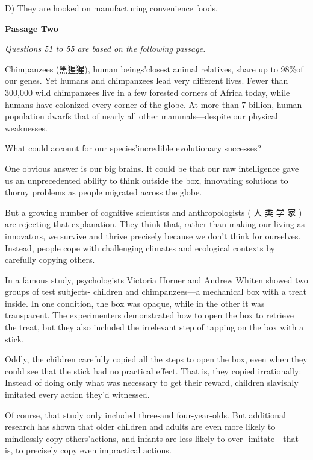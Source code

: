 \noindent\hspace{1.6em}D) They are hooked on manufacturing convenience foods.\par
\smallskip
\noindent\textbf{Passage Two}\par
\smallskip
\noindent\textit{Questions 51 to 55 are based on the following passage.}\par
\smallskip
\noindent Chimpanzees (黑猩猩), human beings'closest animal relatives, share up to 98\%of our genes. Yet humans and chimpanzees lead very different lives. Fewer than 300,000 wild chimpanzees live in a few forested corners of Africa today, while humans have colonized every corner of the globe. At more than 7 billion, human population dwarfs that of nearly all other mammals---despite our physical weaknesses.\par
\smallskip
\noindent What could account for our species'incredible evolutionary successes?\par
\smallskip
\noindent One obvious answer is our big brains. It could be that our raw intelligence gave us an unprecedented ability to think outside the box, innovating solutions to thorny problems as people migrated across the globe.\par
\smallskip
\noindent But a growing number of cognitive scientists and anthropologists ( 人 类 学 家 ) are rejecting that explanation. They think that, rather than making our living as innovators, we survive and thrive precisely because we don't think for ourselves. Instead, people cope with challenging climates and ecological contexts by carefully copying others.\par
\smallskip
\noindent In a famous study, psychologists Victoria Horner and Andrew Whiten showed two groups of test subjects- children and chimpanzees---a mechanical box with a treat inside. In one condition, the box was opaque, while in the other it was transparent. The experimenters demonstrated how to open the box to retrieve the treat, but they also included the irrelevant step of tapping on the box with a stick.\par
\smallskip
\noindent Oddly, the children carefully copied all the steps to open the box, even when they could see that the stick had no practical effect. That is, they copied irrationally: Instead of doing only what was necessary to get their reward, children slavishly imitated every action they'd witnessed.\par
\smallskip
\noindent Of course, that study only included three-and four-year-olds. But additional research has shown that older children and adults are even more likely to mindlessly copy others'actions, and infants are less likely to over- imitate---that is, to precisely copy even impractical actions.\par
